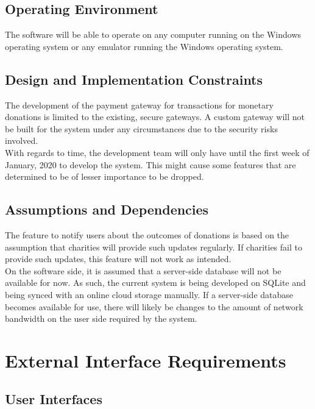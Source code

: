 \documentclass{scrreprt}
\begin{document}
\section{Operating Environment}

The software will be able to operate on any computer running on the Windows operating system or any emulator running the Windows operating system.\\

\section{Design and Implementation Constraints}

The development of the payment gateway for transactions for monetary donations is limited to the existing, secure gateways. A custom gateway will not be built for the system under any circumstances due to the security risks involved.\\

With regards to time, the development team will only have until the first week of January, 2020 to develop the system. This might cause some features that are determined to be of lesser importance to be dropped.\\

\section{Assumptions and Dependencies}

The feature to notify users about the outcomes of donations is based on the assumption that charities will provide such updates regularly. If charities fail to provide such updates, this feature will not work as intended.\\

On the software side, it is assumed that a server-side database will not be available for now. As such, the current system is being developed on SQLite and being synced with an online cloud storage manually. If a server-side database becomes available for use, there will likely be changes to the amount of network bandwidth on the user side required by the system.\\


\chapter{External Interface Requirements}

\section{User Interfaces}
\end{document}

